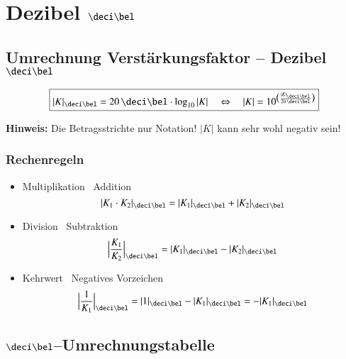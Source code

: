 \section[Dezibel \deci \bel]{Dezibel $\deci \bel$}


\subsection[Umrechnung Verstärkungsfaktor -- Dezibel \deci \bel]{Umrechnung Verstärkungsfaktor -- Dezibel $\deci \bel$}

$$ \boxed{ |K|_{\deci \bel} = 20 \, \deci \bel \cdot \log_{10} |K| \quad \Leftrightarrow \quad 
            |K| = 10 ^{\big( \frac{|K|_{\deci \bel}}{20 \, \deci \bel}\big)}  } $$

\textbf{Hinweis:} Die Betragsstrichte nur Notation! $|K|$ kann sehr wohl negativ sein!


\subsubsection{Rechenregeln}

\begin{itemize}
    \item Multiplikation \textrightarrow\ Addition 
        \vspace{-0.2cm}
        $$ | K_1 \cdot K_2 |_{\deci \bel} = | K_1 |_{\deci \bel} + | K_2 |_{\deci \bel} $$
    \item Division \textrightarrow\ Subtraktion 
        $$ \Big| \frac{K_1}{K_2} \Big|_{\deci \bel} = | K_1 |_{\deci \bel} - | K_2 |_{\deci \bel} $$
    \item Kehrwert \textrightarrow\ Negatives Vorzeichen 
        $$ \Big| \frac{1}{K_1} \Big|_{\deci \bel} = | 1 |_{\deci \bel} - | K_1 |_{\deci \bel} = - | K_1 |_{\deci \bel} $$
\end{itemize}


\subsection[\deci \bel--Umrechnungstabelle]{$\deci \bel$--Umrechnungstabelle}

